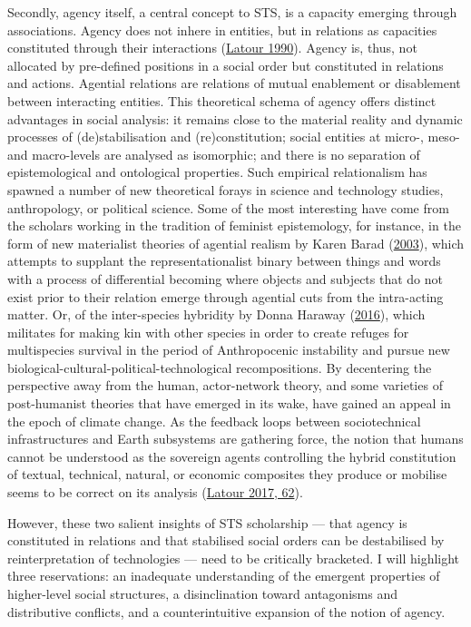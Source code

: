 \documentclass[a4paper, nobind]{templates/ociamthesis}
\begin{document}
Secondly, agency itself, a central concept to STS, is a capacity emerging through associations. Agency does not inhere in entities, but in relations as capacities constituted through their interactions (\protect\hyperlink{ref-latour_technology_1990}{Latour 1990}). Agency is, thus, not allocated by pre-defined positions in a social order but constituted in relations and actions. Agential relations are relations of mutual enablement or disablement between interacting entities. This theoretical schema of agency offers distinct advantages in social analysis: it remains close to the material reality and dynamic processes of (de)stabilisation and (re)constitution; social entities at micro-, meso- and macro-levels are analysed as isomorphic; and there is no separation of epistemological and ontological properties. Such empirical relationalism has spawned a number of new theoretical forays in science and technology studies, anthropology, or political science. Some of the most interesting have come from the scholars working in the tradition of feminist epistemology, for instance, in the form of new materialist theories of agential realism by Karen Barad (\protect\hyperlink{ref-barad_posthumanist_2003}{2003}), which attempts to supplant the representationalist binary between things and words with a process of differential becoming where objects and subjects that do not exist prior to their relation emerge through agential cuts from the intra-acting matter. Or, of the inter-species hybridity by Donna Haraway (\protect\hyperlink{ref-haraway_staying_2016}{2016}), which militates for making kin with other species in order to create refuges for multispecies survival in the period of Anthropocenic instability and pursue new biological-cultural-political-technological recompositions. By decentering the perspective away from the human, actor-network theory, and some varieties of post-humanist theories that have emerged in its wake, have gained an appeal in the epoch of climate change. As the feedback loops between sociotechnical infrastructures and Earth subsystems are gathering force, the notion that humans cannot be understood as the sovereign agents controlling the hybrid constitution of textual, technical, natural, or economic composites they produce or mobilise seems to be correct on its analysis (\protect\hyperlink{ref-latour_facing_2017}{Latour 2017, 62}).

However, these two salient insights of STS scholarship --- that agency is constituted in relations and that stabilised social orders can be destabilised by reinterpretation of technologies --- need to be critically bracketed. I will highlight three reservations: an inadequate understanding of the emergent properties of higher-level social structures, a disinclination toward antagonisms and distributive conflicts, and a counterintuitive expansion of the notion of agency.
\end{document}
